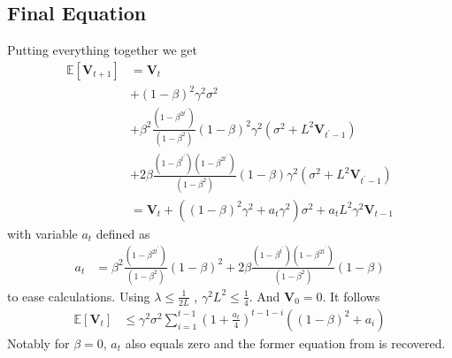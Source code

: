 \documentclass[10pt,twocolumn,letterpaper]{article}
\begin{document}
\subsection{Final Equation}
Putting everything together we get
\begin{align*}
    \mathbb{E}\left[\mathbf{V}_{t+1}\right] &= \mathbf{V}_t\\
    &+ (1-\beta)^2\gamma^2\sigma^2\\
    &+ \beta^2 \frac{(1-\beta^{2t^\prime})}{(1-\beta^2)}(1-\beta)^2\gamma^2 \left(\sigma^2+ L^2 \mathbf{V}_{t^\prime-1} \right)\\
    &+2 \beta \frac{(1-\beta^{t^\prime})(1-\beta^{2t^\prime})}{(1-\beta^2)}(1-\beta)\gamma^2 \left(\sigma^2
    +  L^2 \mathbf{V}_{t^{\prime}-1}\right) \\
    &= \mathbf{V}_t + \left((1-\beta)^2\gamma^2 + a_t\gamma^2 \right)\sigma^2 + a_t L^2 \gamma^2\mathbf{V}_{t-1}
\end{align*}
with variable $a_t$ defined as
\begin{align*}
    a_t &=  \beta^2 \frac{(1-\beta^{2t^\prime})}{(1-\beta^2)}(1-\beta)^2 + 2 \beta \frac{(1-\beta^{t^\prime})(1-\beta^{2t^\prime})}{(1-\beta^2)}(1-\beta)
\end{align*}
to ease calculations.
Using $\lambda \leq \frac{1}{2L}$ \cite{khaled2022}, $\gamma^2L^2 \leq \frac{1}{4}$.
And $\mathbf{V}_{0} = 0$. It follows
\begin{align*}
    \mathbb{E}\left[\mathbf{V}_{t}\right] &\leq \gamma^2\sigma^2\sum_{i=1}^{t-1} (1 + \frac{a_t}{4})^{t-1-i} \left((1-\beta)^2 + a_i \right)
\end{align*}
Notably for $\beta = 0$, $a_t$ also equals zero and the former equation from \cite{BALLES2024P} is recovered.

{\small


}
\end{document}
